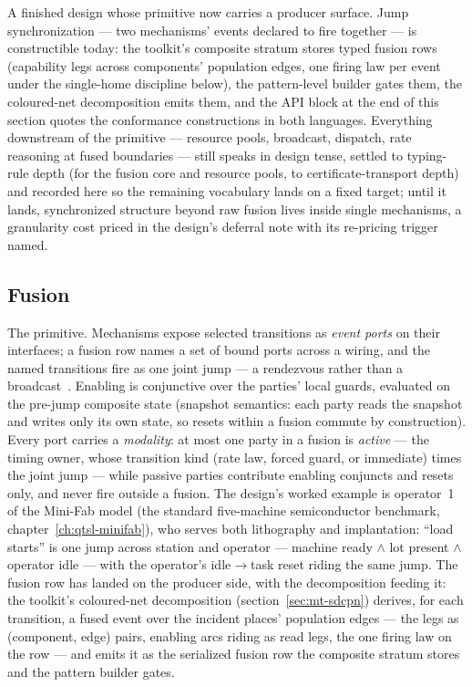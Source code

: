 A finished design whose primitive now carries a producer surface.
Jump synchronization --- two mechanisms' events declared to fire
together --- is constructible today: the toolkit's composite stratum
stores typed fusion rows (capability legs across components'
population edges, one firing law per event under the single-home
discipline below), the pattern-level builder gates them, the
coloured-net decomposition emits them, and the API block at the end
of this section quotes the conformance constructions in both
languages. Everything downstream of the primitive --- resource
pools, broadcast, dispatch, rate reasoning at fused boundaries ---
still speaks in design tense, settled to typing-rule depth (for the
fusion core and resource pools, to certificate-transport depth) and
recorded here so the remaining vocabulary lands on a fixed target;
until it lands, synchronized structure beyond raw fusion lives
inside single mechanisms, a granularity cost priced in the
design's deferral note with its re-pricing trigger named.

\subsection{Fusion}

The primitive. Mechanisms expose selected transitions as \emph{event
ports} on their interfaces; a fusion row names a set of bound ports
across a wiring, and the named transitions fire as one joint jump ---
a rendezvous rather than a broadcast~\cite{cleaveland18hbmc}. Enabling is conjunctive over the parties'
local guards, evaluated on the pre-jump composite state (snapshot
semantics: each party reads the snapshot and writes only its own
state, so resets within a fusion commute by construction). Every port
carries a \emph{modality}: at most one party in a fusion is
\emph{active} --- the timing owner, whose transition kind (rate law,
forced guard, or immediate) times the joint jump --- while passive
parties contribute enabling conjuncts and resets only, and never
fire outside a fusion. The design's worked example is operator~1 of
the Mini-Fab model (the standard five-machine semiconductor
benchmark, chapter~\ref{ch:qtsl-minifab}), who serves both
lithography and implantation: ``load starts'' is one jump across
station and operator --- machine ready $\wedge$ lot present $\wedge$
operator idle --- with the operator's idle$\to$task reset riding the
same jump. The fusion row has landed on the producer side, with the
decomposition feeding it: the toolkit's coloured-net decomposition
(section~\ref{sec:mt-sdcpn}) derives, for each transition, a fused
event over the incident places' population edges --- the legs as
(component, edge) pairs, enabling arcs riding as read legs, the one
firing law on the row --- and emits it as the serialized fusion row
the composite stratum stores and the pattern builder gates.

